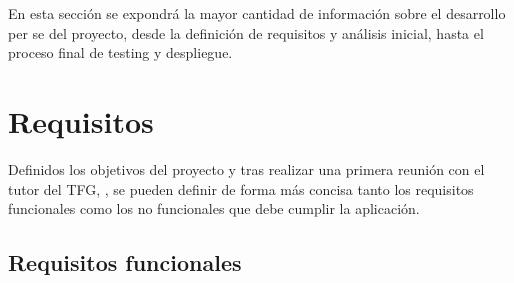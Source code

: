 En esta sección se expondrá la mayor cantidad de información sobre el desarrollo per se
del proyecto, desde la definición de requisitos y análisis inicial, hasta el proceso final
de testing y despliegue.

\section{Requisitos}

Definidos los objetivos del proyecto y tras realizar una primera reunión
con el tutor del TFG, \nombretutor, se pueden definir de forma más concisa tanto los
requisitos funcionales como los no funcionales que debe cumplir la aplicación.

\subsection{Requisitos funcionales}

